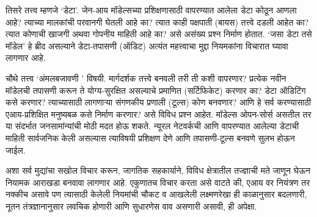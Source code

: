तिसरे तत्त्व म्हणजे `डेटा'. जेन-आय मॉडेल्सच्या प्रशिक्षणासाठी वापरण्यात आलेला डेटा कोठून आणला आहे? त्याच्या मालकांची परवानगी घेतली आहे का? त्यात काही पक्षपाती (बायस) तत्त्वे  दडली आहेत का? त्यात कोणाची खाजगी अथवा गोपनीय माहिती आहे का? असे असंख्य प्रश्न निर्माण होतात. `जसा डेटा तसे मॉडेल' हे ब्रीद असल्याने डेटा-तपासणी (ऑडिट) अत्यंत महत्त्वाचा  मुद्दा नियमकांना विचारात घ्यावा लागणार आहे.

चौथे तत्त्व `अंमलबजावणी ' विषयी. मार्गदर्शक तत्त्वे  बनवली तरी ती कशी वापरणार? प्रत्येक नवीन मॉडेलची तपासणी करून ते योग्य-सुरक्षित असल्याचे प्रमाणित (सर्टिफिकेट) करणार का? डेटा ऑडिटिंग कसे करणार? त्याच्यासाठी लागणाऱ्या संगणकीय प्रणाली (टूल्स) कोण बनवणार? आणि हे सर्व करण्यासाठी एआय-प्रशिक्षित मनुष्यबळ कसे निर्माण करणार? असे विविध प्रश्न आहेत. मॉडेल्स ओपन-सोर्स असतील तर या संदर्भात जनसामांन्यांची मोठी मदत होऊ शकते. न्यूरल नेटवर्कची आणि वापरण्यात आलेल्या डेटाची माहिती सार्वजनिक केली असल्यास त्याविषयी प्रशिक्षण देणे आणि तपासणी-टूल्स बनवणे सुलभ होऊन जाईल.

अशा सर्व मुद्यांचा सखोल विचार करून, जागतिक सहकार्याने, विविध क्षेत्रातील तज्ज्ञाची मते जाणून घेऊन नियामक आराखडा बनवावा लागणार आहे. एकुणातच विचार करता असे वाटते की, एआय वर नियंत्रण तर नक्कीच असावे पण त्यासाठी केलेली नियमांची चौकट व आखलेली लक्ष्मणरेखा ही काळानुसार बदलणारी, नूतन तंत्रज्ञानानुसार लवचिक होणारी आणि सुधारणेस वाव असणारी असावी, ही अपेक्षा.